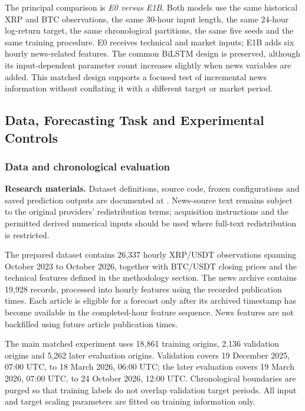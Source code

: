 The principal comparison is \emph{E0 versus E1B}. Both models use the same historical XRP and BTC observations, the same 30-hour input length, the same 24-hour log-return target, the same chronological partitions, the same five seeds and the same training procedure. E0 receives technical and market inputs; E1B adds six hourly news-related features. The common BiLSTM design is preserved, although its input-dependent parameter count increases slightly when news variables are added. This matched design supports a focused test of incremental news information without conflating it with a different target or market period.

\subsection{Data, Forecasting Task and Experimental Controls}
\label{subsec:experimental-protocol}

\subsubsection{Data and chronological evaluation}

\noindent\textbf{Research materials.} Dataset definitions, source code, frozen configurations and saved prediction outputs are documented at \ResearchRepository. News-source text remains subject to the original providers' redistribution terms; acquisition instructions and the permitted derived numerical inputs should be used where full-text redistribution is restricted.

The prepared dataset contains 26,337 hourly XRP/USDT observations spanning October 2023 to October 2026, together with BTC/USDT closing prices and the technical features defined in the methodology section. The news archive contains 19,928 records, processed into hourly features using the recorded publication times. Each article is eligible for a forecast only after its archived timestamp has become available in the completed-hour feature sequence. News features are not backfilled using future article publication times.

The main matched experiment uses 18,861 training origins, 2,136 validation origins and 5,262 later evaluation origins. Validation covers 19 December 2025, 07:00 UTC, to 18 March 2026, 06:00 UTC; the later evaluation covers 19 March 2026, 07:00 UTC, to 24 October 2026, 12:00 UTC. Chronological boundaries are purged so that training labels do not overlap validation target periods. All input and target scaling parameters are fitted on training information only.

